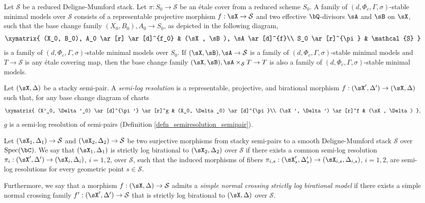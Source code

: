 \documentclass[11pt,letterpaper]{amsart}
\numberwithin{equation}{section}
\begin{document}
    Let $\mathcal{S}$ be a reduced Deligne-Mumford stack. Let $\pi: S_0 \to \mathcal{S}$ be an \'etale cover from a reduced scheme $S_0$. A family of $(d, \Phi_c, \Gamma, \sigma)$-stable minimal models over $\mathcal{S}$ consists of a representable projective morphism $f: \sX \to \mathcal{S}$ and two effective $\bQ$-divisors $\sA$ and $\sB$ on $\sX$, such that the base change family $(X_0, B_0), A_0 \to S_0$, as depicted in the following diagram,  
    $$
    \xymatrix{
    	(X_0, B_0), A_0 \ar[r] \ar[d]^{f_0} & (\sX, \sB), \sA \ar[d]^{f}\\
    	S_0 \ar[r]^{\pi} & \mathcal{S}
    }
    $$  
    is a family of $(d, \Phi_c, \Gamma, \sigma)$-stable minimal models over $S_0$. If $(\sX, \sB), \sA \to \mathcal{S}$ is a family of $(d, \Phi_c, \Gamma, \sigma)$-stable minimal models and $T \to \mathcal{S}$ is any \'etale covering map, then the base change family $(\sX, \sB), \sA \times_{\mathcal{S}} T \to T$ is also a family of $(d, \Phi_c, \Gamma, \sigma)$-stable minimal models.
    \begin{defn}
    	Let $(\sX, \Delta)$ be a stacky semi-pair. A \emph{semi-log resolution} is a representable, projective, and birational morphism $f: (\sX', \Delta') \to (\sX, \Delta)$ such that, for any base change diagram of charts  
    	$$
    	\xymatrix{
    		(X'_0, \Delta'_0) \ar[d]^{\pi'} \ar[r]^g & (X_0, \Delta_0) \ar[d]^{\pi}\\
    		(\sX', \Delta') \ar[r]^f & (\sX, \Delta)
    	},
    	$$  
    	$g$ is a semi-log resolution of semi-pairs (Definition \ref{defn_semiresolution_semipair}).
    \end{defn}
    \begin{defn}
    	Let $(\sX_1, \Delta_1) \to \mathcal{S}$ and $(\sX_2, \Delta_2) \to \mathcal{S}$ be two surjective morphisms from stacky semi-pairs to a smooth Deligne-Mumford stack $\mathcal{S}$ over ${\rm Spec}(\bC)$. We say that $(\sX_1, \Delta_1)$ is strictly log birational to $(\sX_2, \Delta_2)$ over $\mathcal{S}$ if there exists a common semi-log resolution $\pi_i: (\sX', \Delta') \to (\sX_i, \Delta_i)$, $i = 1, 2$, over $\mathcal{S}$, such that the induced morphisms of fibers $\pi_{i,s}: (\sX'_s, \Delta'_s) \to (\sX_{i,s}, \Delta_{i,s})$, $i = 1, 2$, are semi-log resolutions for every geometric point $s \in \mathcal{S}$.  
    	
    	Furthermore, we say that a morphism $f: (\sX, \Delta) \to \mathcal{S}$ admits a \emph{simple normal crossing strictly log birational model} if there exists a simple normal crossing family $f': (\sX', \Delta') \to \mathcal{S}$ that is strictly log birational to $(\sX, \Delta)$ over $\mathcal{S}$.
    \end{defn}
\end{document}

